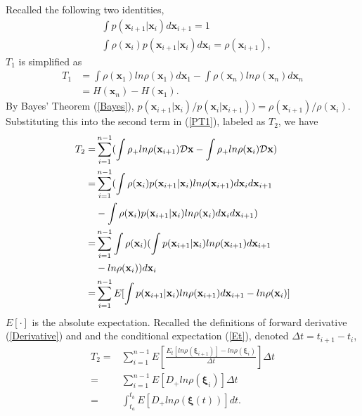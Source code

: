 \documentclass[%
 aip, 
 amsmath,amssymb,amsthm,
 nofootinbib,
 reprint,
]{revtex4-1}
\begin{document}
Recalled the following two identities,
\begin{equation}
    \label{probIDs}
    \begin{split}
        &\int p(\mathbf{x}_{i+1}|\mathbf{x}_i)d\mathbf{x}_{i+1}=1 \\
        &\int\rho(\mathbf{x}_i)p(\mathbf{x}_{i+1}|\mathbf{x}_i)d\mathbf{x}_{i}=\rho(\mathbf{x}_{i+1}),
    \end{split}
\end{equation}
$T_1$ is simplified as
\begin{equation}
    \label{PT3}
    \begin{split}
    T_1 &= \int \rho(\mathbf{x}_1)ln\rho(\mathbf{x}_1)d\mathbf{x}_1 - \int \rho(\mathbf{x}_n)ln\rho(\mathbf{x}_n)d\mathbf{x}_n \\
    &= H(\mathbf{x}_n) - H(\mathbf{x}_1).
    \end{split}
\end{equation}
By Bayes' Theorem (\ref{Bayes}), $p(\mathbf{x}_{i+1}|\mathbf{x}_{i})/p(\mathbf{x}_{i}|\mathbf{x}_{i+1}))=\rho(\mathbf{x}_{i+1})/\rho(\mathbf{x}_i)$. Substituting this into the second term in (\ref{PT1}), labeled as $T_2$, we have
\begin{equation}
    \label{PT4}
    \begin{split}
    T_2 =& \sum_{i=1}^{n-1}(\int \rho_+ln\rho(\mathbf{x}_{i+1}){\cal{D}}\mathbf{x} - \int \rho_+ln\rho(\mathbf{x}_i){\cal{D}}\mathbf{x} )\\
    =& \sum_{i=1}^{n-1}(\int \rho(\mathbf{x}_{i})p(\mathbf{x}_{i+1}|\mathbf{x}_{i})ln\rho(\mathbf{x}_{i+1})d\mathbf{x}_{i}d\mathbf{x}_{i+1}\\
    &-\int \rho(\mathbf{x}_{i})p(\mathbf{x}_{i+1}|\mathbf{x}_{i})ln\rho(\mathbf{x}_{i})d\mathbf{x}_{i}d\mathbf{x}_{i+1})\\
    =& \sum_{i=1}^{n-1}\int \rho(\mathbf{x}_{i})(\int p(\mathbf{x}_{i+1}|\mathbf{x}_{i})ln\rho(\mathbf{x}_{i+1})d\mathbf{x}_{i+1} \\
    & - ln\rho(\mathbf{x}_{i}))d\mathbf{x}_{i}\\
    =& \sum_{i=1}^{n-1} E[\int p(\mathbf{x}_{i+1}|\mathbf{x}_{i})ln\rho(\mathbf{x}_{i+1})d\mathbf{x}_{i+1} - ln\rho(\mathbf{x}_{i})]
    \end{split}
\end{equation}
$E[\cdot]$ is the absolute expectation. Recalled the definitions of forward derivative (\ref{Derivative}) and and the conditional expectation (\ref{Et}), denoted $\Delta t = t_{i+1} - t_i$,
\begin{equation}
    \label{PT5}
    \begin{split}
    T_2 =& \sum_{i=1}^{n-1} E[\frac{E_t[ln\rho(\mathbf{\xi}_{i+1})] - ln\rho(\mathbf{\xi}_{i}) }{\Delta t}]\Delta t \\
    = & \sum_{i=1}^{n-1} E[D_+ln\rho(\mathbf{\xi}_i)]\Delta t\\
    = & \int_{t_a}^{t_b} E[D_+ln\rho(\mathbf{\xi}(t))] dt.
    \end{split}
\end{equation}
\end{document}
